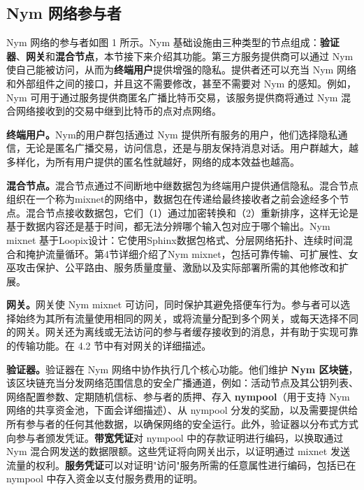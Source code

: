 \documentclass{article}
\begin{document}
	\subsection{Nym 网络参与者}
	
	Nym 网络的参与者如图 1 所示。Nym 基础设施由三种类型的节点组成：\textbf{验证器}、\textbf{网关}和\textbf{混合节点}，本节接下来介绍其功能。第三方服务提供商可以通过 Nym 使自己能被访问，从而为\textbf{终端用户}提供增强的隐私。提供者还可以充当 Nym 网络和外部组件之间的接口，并且这不需要修改，甚至不需要对 Nym 的感知。例如，Nym 可用于通过服务提供商匿名广播比特币交易，该服务提供商将通过 Nym 混合网络接收到的交易中继到比特币的点对点网络。\newline

	\textbf{终端用户。}Nym的用户群包括通过 Nym 提供所有服务的用户，他们选择隐私通信，无论是匿名广播交易，访问信息，还是与朋友保持消息对话。用户群越大，越多样化，为所有用户提供的匿名性就越好，网络的成本效益也越高。\newline

	\textbf{混合节点。}混合节点通过不间断地中继数据包为终端用户提供通信隐私。混合节点组织在一个称为mixnet的网络中，数据包在传递给最终接收者之前会途经多个节点。混合节点接收数据包，它们（1）通过加密转换和（2）重新排序，这样无论是基于数据内容还是基于时间，都无法分辨哪个输入包对应于哪个输出。Nym mixnet 基于Loopix设计\cite{ref89}：它使用Sphinx数据包格式\cite{ref29}、分层网络拓扑\cite{ref36}、连续时间混合\cite{ref66}和掩护流量循环\cite{ref30}。第4节详细介绍了Nym mixnet，包括可靠传输、可扩展性、女巫攻击保护、公平路由、服务质量度量、激励以及实际部署所需的其他修改和扩展。\newline

	\textbf{网关。}网关使 Nym mixnet 可访问，同时保护其避免搭便车行为。参与者可以选择始终为其所有流量使用相同的网关，或将流量分配到多个网关，或每天选择不同的网关。网关还为离线或无法访问的参与者缓存接收到的消息，并有助于实现可靠的传输功能。在 4.2 节中有对网关的详细描述。\newline

	\textbf{验证器。}验证器在 Nym 网络中协作执行几个核心功能。他们维护 \textbf{Nym 区块链}，该区块链充当分发网络范围信息的安全广播通道，例如：活动节点及其公钥列表、网络配置参数、定期随机信标、参与者的质押、存入 \textbf{nympool}（用于支持 Nym 网络的共享资金池，下面会详细描述）、从 nympool 分发的奖励，以及需要提供给所有参与者的任何其他数据，以确保网络的安全运行。此外，验证器以分布式方式向参与者颁发凭证。\textbf{带宽凭证}对 nympool 中的存款证明进行编码，以换取通过 Nym 混合网发送的数据限额。这些凭证将向网关出示，以证明通过 mixnet 发送流量的权利。\textbf{服务凭证}可以对证明"访问"服务所需的任意属性进行编码，包括已在 nympool 中存入资金以支付服务费用的证明。\newline
\end{document}
